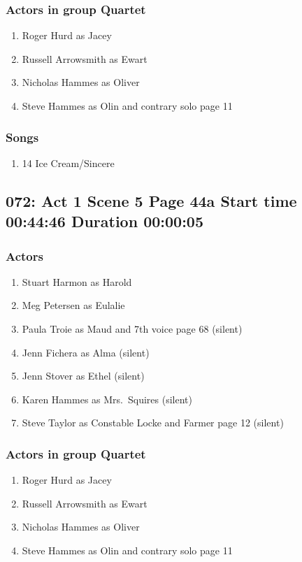 \subsubsection{Actors in group Quartet}
\begin{enumerate}
\item Roger Hurd as Jacey
\item Russell Arrowsmith as Ewart
\item Nicholas Hammes as Oliver
\item Steve Hammes as Olin and contrary solo page 11
\end{enumerate}

\subsubsection{Songs}
\begin{enumerate}
\item 14 Ice Cream/Sincere
\end{enumerate}
\subsection{072: Act 1 Scene 5 Page 44a Start time 00:44:46 Duration 00:00:05}

\subsubsection{Actors}
\begin{enumerate}
\item Stuart Harmon as Harold
\item Meg Petersen as Eulalie
\item Paula Troie as Maud and 7th voice page 68 (silent)
\item Jenn Fichera as Alma (silent)
\item Jenn Stover as Ethel (silent)
\item Karen Hammes as Mrs.~Squires (silent)
\item Steve Taylor as Constable Locke and Farmer page 12 (silent)
\end{enumerate}
\subsubsection{Actors in group Quartet}
\begin{enumerate}
\item Roger Hurd as Jacey
\item Russell Arrowsmith as Ewart
\item Nicholas Hammes as Oliver
\item Steve Hammes as Olin and contrary solo page 11
\end{enumerate}

